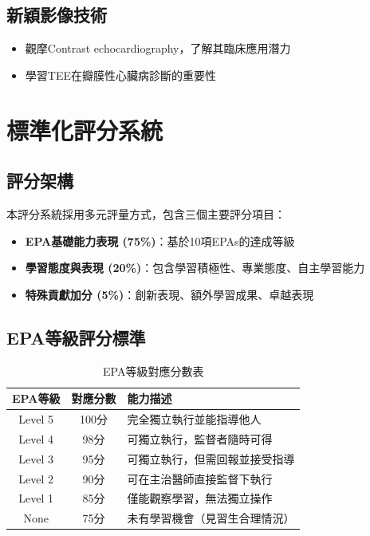 \documentclass[12pt,a4paper]{article}
\begin{document}
\subsection{新穎影像技術}

\begin{itemize}
\item 觀摩Contrast echocardiography，了解其臨床應用潛力
\item 學習TEE在瓣膜性心臟病診斷的重要性
\end{itemize}

\section{標準化評分系統}

\subsection{評分架構}

本評分系統採用多元評量方式，包含三個主要評分項目：
\begin{itemize}
\item \textbf{EPA基礎能力表現 (75\%)}：基於10項EPAs的達成等級
\item \textbf{學習態度與表現 (20\%)}：包含學習積極性、專業態度、自主學習能力
\item \textbf{特殊貢獻加分 (5\%)}：創新表現、額外學習成果、卓越表現
\end{itemize}

\subsection{EPA等級評分標準}

\begin{table}[h]
\centering
\caption{EPA等級對應分數表}
\begin{tabular}{|c|c|p{8cm}|}
\hline
\textbf{EPA等級} & \textbf{對應分數} & \textbf{能力描述} \\
\hline
Level 5 & 100分 & 完全獨立執行並能指導他人 \\
\hline
Level 4 & 98分 & 可獨立執行，監督者隨時可得 \\
\hline
Level 3 & 95分 & 可獨立執行，但需回報並接受指導 \\
\hline
Level 2 & 90分 & 可在主治醫師直接監督下執行 \\
\hline
Level 1 & 85分 & 僅能觀察學習，無法獨立操作 \\
\hline
None & 75分 & 未有學習機會（見習生合理情況）\\
\hline
\end{tabular}
\end{table}
\end{document}
